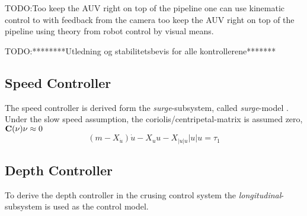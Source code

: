 	TODO:Too keep the AUV right on top of the pipeline one can use kinematic control to with feedback from the 
	camera too keep the AUV right on top of the pipeline using theory from robot control by visual means.
	
	
	TODO:********Utledning og stabilitetsbevis for alle kontrollerene*******
	\subsection{Speed Controller}
		The speed controller is derived form the \textit{surge}-subsystem, called \textit{surge}-model
		\cite{fossen}. Under the slow speed assumption, the coriolis/centripetal-matrix is assumed
		zero, $\mathbf{C}(\mathbf{\nu})\mathbf{\nu} \approx 0$  
		\begin{equation}
			(m - X_{\dot{u}})\dot{u} - X_u u - X_{|u|u}|u| u = \tau_1
		\end{equation}
	
	
	
	\subsection{Depth Controller}
		To derive the depth controller in the crusing control system the
		\textit{longitudinal}-subsystem is used as the control model.

	
